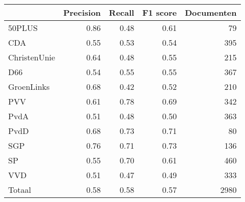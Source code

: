 \begin{tabular}{lrrrr}
\toprule
{} &  Precision &  Recall &  F1 score &  Documenten \\
\midrule
50PLUS       &       0.86 &    0.48 &      0.61 &          79 \\
CDA          &       0.55 &    0.53 &      0.54 &         395 \\
ChristenUnie &       0.64 &    0.48 &      0.55 &         215 \\
D66          &       0.54 &    0.55 &      0.55 &         367 \\
GroenLinks   &       0.68 &    0.42 &      0.52 &         210 \\
PVV          &       0.61 &    0.78 &      0.69 &         342 \\
PvdA         &       0.51 &    0.48 &      0.50 &         363 \\
PvdD         &       0.68 &    0.73 &      0.71 &          80 \\
SGP          &       0.76 &    0.71 &      0.73 &         136 \\
SP           &       0.55 &    0.70 &      0.61 &         460 \\
VVD          &       0.51 &    0.47 &      0.49 &         333 \\
Totaal       &       0.58 &    0.58 &      0.57 &        2980 \\
\bottomrule
\end{tabular}
